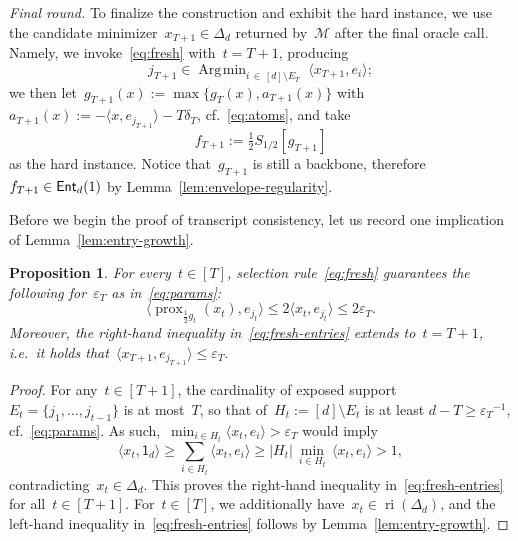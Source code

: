 \documentclass[11pt]{article}
\numberwithin{equation}{section}
\let\le\leqslant
\let\ge\geqslant
\newtheorem{proposition}[theorem]{Proposition}
\theoremstyle{remark}
\newcommand{\ones}{\mathsf{1}_d}
\newcommand{\veps}{\varepsilon}
\newcommand{\ri}{\operatorname{ri}}
\newcommand{\Env}{S}
\newcommand{\Ent}{\textup{\textsf{Ent}}}
\newcommand{\Mtd}{\mathscr{M}}
\newcommand{\Fh}{\Ent_d}
\newcommand{\Simp}{\Delta_d}
\newcommand{\prox}{\operatorname{prox}}
\DeclareMathOperator*{\Argmin}{\operatorname{Arg}\!\min}
\newcommand{\1}{\mathbf{1}}
\newcommand{\half}{\frac{1}{2}}
\begin{document}
{\em Final round.}
To finalize the construction and exhibit the hard instance, we use the candidate minimizer~$x_{T+1} \in \Simp$ returned by~$\Mtd$ after the final oracle call.
Namely, we invoke~\eqref{eq:fresh} with~$t = T+1$, producing
\[
j_{T+1} \in \Argmin_{i \,\in\, [d] \setminus E_{T}} \; \langle x_{T+1}, e_i \rangle;
\]
we then let~$g_{T+1}(x) := \max\{g_T(x), a_{T+1}(x)\}$ with~$a_{T+1}(x):=-\langle x, e_{j_{T+1}} \rangle - T\delta_T$, cf.~\eqref{eq:atoms}, and take
\begin{equation}
\label{eq:final-instance}
f_{T+1} := \tfrac{1}{2} \Env_{1/2}[g_{T+1}]
\end{equation}
as the hard instance. Notice that~$g_{T+1}$ is still a backbone, therefore~$f_{T+1} \in \Fh(1)$ by Lemma~\ref{lem:envelope-regularity}.

Before we begin the proof of transcript consistency, let us record one implication of Lemma~\ref{lem:entry-growth}.

\begin{proposition}
\label{prop:fresh-entries}
For every~$t \in [T]$, selection rule~\eqref{eq:fresh} guarantees the following for~$\veps_T$ as in~\eqref{eq:params}:
\begin{equation}
\label{eq:fresh-entries}
\langle \prox_{\half g_{t}}(x_t), e_{j_t} \rangle 
\le 2\langle x_t, e_{j_t} \rangle 
\le 2\veps_T.
\end{equation}
Moreover, the right-hand inequality in~\eqref{eq:fresh-entries} extends to~$t = T+1$, i.e.~it holds that~$\langle x_{T+1}, e_{j_{T+1}} \rangle \le \veps_T.$ 
\end{proposition}
%
\begin{proof}
For any~$t \in [T+1]$, the cardinality of exposed support~$E_t = \{j_1,\dots,j_{t-1}\}$ is at most~$T$, so that of~$H_t := [d] \setminus E_t$ is at least
$
d-T \ge \veps_T{}^{-1},
$
cf.~\eqref{eq:params}. 
As such,~$\min_{i \in H_t} \langle x_t, e_i \rangle > \veps_T$ would imply
\[
\langle x_t, \ones \rangle \ge \sum_{i \in H_t} \langle x_t, e_i \rangle \ge |H_t| \, \min_{i \in H_t} \, \langle x_t, e_i \rangle > 1,
\]
contradicting~$x_t \in \Simp$. This proves the right-hand inequality in~\eqref{eq:fresh-entries} for all~$t \in [T+1]$. 
For~$t \in [T]$, we additionally have~$x_{t} \in \ri(\Simp)$, and the left-hand inequality in~\eqref{eq:fresh-entries} follows by Lemma~\ref{lem:entry-growth}.
\end{proof}
\end{document}
